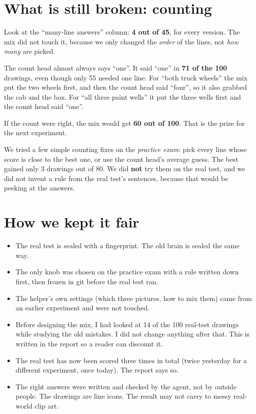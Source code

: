 \documentclass[11pt,a4paper]{article}
\begin{document}


\section*{What is still broken: counting}

Look at the ``many-line answers'' column: \textbf{4 out of 45}, for every version.
The mix did not touch it, because we only changed the \emph{order} of the lines, not \emph{how many} are picked.

The count head almost always says ``one''. It said ``one'' in \textbf{71 of the 100} drawings, even though only 55 needed one line.
For ``both truck wheels'' the mix put the two wheels first, and then the count head said ``four'', so it also grabbed the cab and the box.
For ``all three paint wells'' it put the three wells first and the count head said ``one''.

If the count were right, the mix would get \textbf{60 out of 100}. That is the prize for the next experiment.

We tried a few simple counting fixes on the \emph{practice exam}: pick every line whose score is close to the best one, or use the count head's average guess.
The best gained only 3 drawings out of 80.
We did \textbf{not} try them on the real test, and we did not invent a rule from the real test's sentences, because that would be peeking at the answers.

\section*{How we kept it fair}

\begin{itemize}[leftmargin=1.6em]
  \item The real test is sealed with a fingerprint. The old brain is sealed the same way.
  \item The only knob was chosen on the practice exam with a rule written down first, then frozen in git before the real test ran.
  \item The helper's own settings (which three pictures, how to mix them) came from an earlier experiment and were not touched.
  \item Before designing the mix, I had looked at 14 of the 100 real-test drawings while studying the old mistakes. I did not change anything after that. This is written in the report so a reader can discount it.
  \item The real test has now been scored three times in total (twice yesterday for a different experiment, once today). The report says so.
  \item The right answers were written and checked by the agent, not by outside people. The drawings are line icons. The result may not carry to messy real-world clip art.
\end{itemize}
\end{document}
